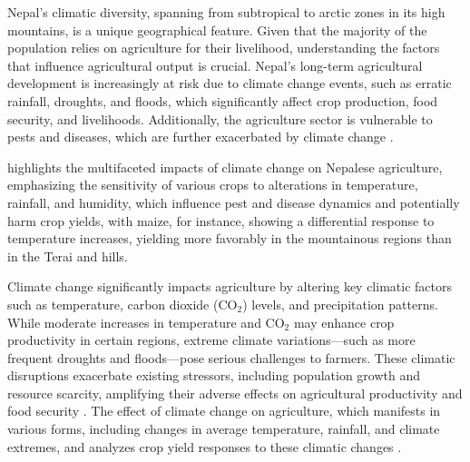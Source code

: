 Nepal’s climatic diversity, spanning from subtropical to arctic zones in its high mountains, is a unique geographical feature. Given that the majority of the population relies on agriculture for their livelihood, understanding the factors that influence agricultural output is crucial. Nepal's long-term agricultural development is increasingly at risk due to climate change events, such as erratic rainfall, droughts, and floods, which significantly affect crop production, food security, and livelihoods. Additionally, the agriculture sector is vulnerable to pests and diseases, which are further exacerbated by climate change \citep{gyawaliOverviewAgricultureNepal2021}.

\citep{mallaClimateChangeIts2009} highlights the multifaceted impacts of climate change on Nepalese agriculture, emphasizing the sensitivity of various crops to alterations in temperature, rainfall, and humidity, which influence pest and disease dynamics and potentially harm crop yields, with maize, for instance, showing a differential response to temperature increases, yielding more favorably in the mountainous regions than in the Terai and hills.

 
Climate change significantly impacts agriculture by altering key climatic factors such as temperature, carbon dioxide (CO$_2$) levels, and precipitation patterns. While moderate increases in temperature and CO$_2$ may enhance crop productivity in certain regions, extreme climate variations—such as more frequent droughts and floods—pose serious challenges to farmers. These climatic disruptions exacerbate existing stressors, including population growth and resource scarcity, amplifying their adverse effects on agricultural productivity and food security \citep{global_paudel_2015}. The effect of climate change on agriculture, which manifests in various forms, including changes in average temperature, rainfall, and climate extremes, and analyzes crop yield responses to these climatic changes \citep{regmiCropYieldResponse2019}.


